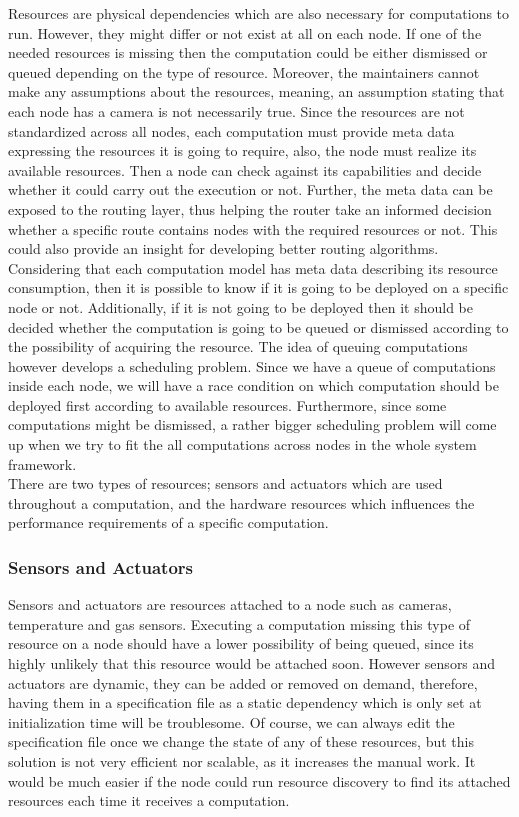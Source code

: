 Resources are physical dependencies which are also necessary for computations to run. However, they might differ or not exist at all on each node. If one of the needed resources is missing then the computation could be either dismissed or queued depending on the type of resource. Moreover, the maintainers cannot make any assumptions about the resources, meaning, an assumption stating that each node has a camera is not necessarily true. Since the resources are not standardized across all nodes, each computation must provide meta data expressing the resources it is going to require, also, the node must realize its available resources. Then a node can check against its capabilities and decide whether it could carry out the execution or not. Further, the meta data can be exposed to the routing layer, thus helping the router take an informed decision whether a specific route contains nodes with the required resources or not. This could also provide an insight for developing better routing algorithms.\\

 \noindent Considering that each computation model has meta data describing its resource consumption, then it is possible to know if it is going to be deployed on a specific node or not. Additionally, if it is not going to be deployed then it should be decided whether the computation is going to be queued or dismissed according to the possibility of acquiring the resource. The idea of queuing computations however develops a scheduling problem. Since we have a queue of computations inside each node, we will have a race condition on which computation should be deployed first according to available resources. Furthermore, since some computations might be dismissed, a rather bigger scheduling problem will come up when we try to fit the all computations across nodes in the whole system framework.\\

  \noindent There are two types of resources; sensors and actuators which are used throughout a computation, and the hardware resources which influences the performance requirements of a specific computation.


\subsubsection{Sensors and Actuators}

  Sensors and actuators are resources attached to a node such as cameras, temperature and gas sensors. Executing a computation missing this type of resource on a node should have a lower possibility of being queued, since its highly unlikely that this resource would be attached soon. However sensors and actuators are dynamic, they can be added or removed on demand, therefore, having them in a specification file as a static dependency which is only set at initialization time will be troublesome. Of course, we can always edit the specification file once we change the state of any of these resources, but this solution is not very efficient nor scalable, as it increases the manual work. It would be much easier if the node could run resource discovery to find its attached resources each time it receives a computation. \\
  
